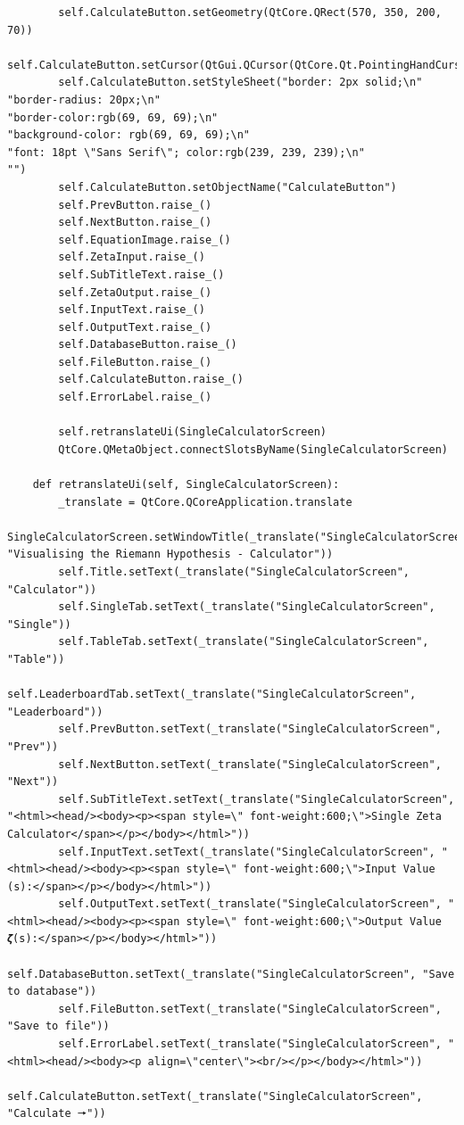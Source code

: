 \documentclass[12pt]{article}
\begin{document}
\begin{lstlisting}
        self.CalculateButton.setGeometry(QtCore.QRect(570, 350, 200, 70))
        self.CalculateButton.setCursor(QtGui.QCursor(QtCore.Qt.PointingHandCursor))
        self.CalculateButton.setStyleSheet("border: 2px solid;\n"
"border-radius: 20px;\n"
"border-color:rgb(69, 69, 69);\n"
"background-color: rgb(69, 69, 69);\n"
"font: 18pt \"Sans Serif\"; color:rgb(239, 239, 239);\n"
"")
        self.CalculateButton.setObjectName("CalculateButton")
        self.PrevButton.raise_()
        self.NextButton.raise_()
        self.EquationImage.raise_()
        self.ZetaInput.raise_()
        self.SubTitleText.raise_()
        self.ZetaOutput.raise_()
        self.InputText.raise_()
        self.OutputText.raise_()
        self.DatabaseButton.raise_()
        self.FileButton.raise_()
        self.CalculateButton.raise_()
        self.ErrorLabel.raise_()

        self.retranslateUi(SingleCalculatorScreen)
        QtCore.QMetaObject.connectSlotsByName(SingleCalculatorScreen)

    def retranslateUi(self, SingleCalculatorScreen):
        _translate = QtCore.QCoreApplication.translate
        SingleCalculatorScreen.setWindowTitle(_translate("SingleCalculatorScreen", "Visualising the Riemann Hypothesis - Calculator"))
        self.Title.setText(_translate("SingleCalculatorScreen", "Calculator"))
        self.SingleTab.setText(_translate("SingleCalculatorScreen", "Single"))
        self.TableTab.setText(_translate("SingleCalculatorScreen", "Table"))
        self.LeaderboardTab.setText(_translate("SingleCalculatorScreen", "Leaderboard"))
        self.PrevButton.setText(_translate("SingleCalculatorScreen", "Prev"))
        self.NextButton.setText(_translate("SingleCalculatorScreen", "Next"))
        self.SubTitleText.setText(_translate("SingleCalculatorScreen", "<html><head/><body><p><span style=\" font-weight:600;\">Single Zeta Calculator</span></p></body></html>"))
        self.InputText.setText(_translate("SingleCalculatorScreen", "<html><head/><body><p><span style=\" font-weight:600;\">Input Value (s):</span></p></body></html>"))
        self.OutputText.setText(_translate("SingleCalculatorScreen", "<html><head/><body><p><span style=\" font-weight:600;\">Output Value 𝜻(s):</span></p></body></html>"))
        self.DatabaseButton.setText(_translate("SingleCalculatorScreen", "Save to database"))
        self.FileButton.setText(_translate("SingleCalculatorScreen", "Save to file"))
        self.ErrorLabel.setText(_translate("SingleCalculatorScreen", "<html><head/><body><p align=\"center\"><br/></p></body></html>"))
        self.CalculateButton.setText(_translate("SingleCalculatorScreen", "Calculate 🠖"))
\end{lstlisting}
\end{document}
